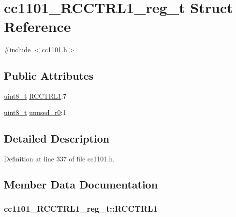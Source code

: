 \hypertarget{structcc1101___r_c_c_t_r_l1__reg__t}{}\section{cc1101\+\_\+\+R\+C\+C\+T\+R\+L1\+\_\+reg\+\_\+t Struct Reference}
\label{structcc1101___r_c_c_t_r_l1__reg__t}


{\ttfamily \#include $<$cc1101.\+h$>$}

\subsection*{Public Attributes}
\begin{DoxyCompactItemize}
\item 
\hyperlink{_p_e___types_8h_aba7bc1797add20fe3efdf37ced1182c5}{uint8\+\_\+t} \hyperlink{structcc1101___r_c_c_t_r_l1__reg__t_a20e9cb8583d5dd8eb3c6ba81bf985db9}{R\+C\+C\+T\+R\+L1}\+:7
\item 
\hyperlink{_p_e___types_8h_aba7bc1797add20fe3efdf37ced1182c5}{uint8\+\_\+t} \hyperlink{structcc1101___r_c_c_t_r_l1__reg__t_a4af45b13f39313a252b4fdfe3fd77864}{unused\+\_\+r0}\+:1
\end{DoxyCompactItemize}


\subsection{Detailed Description}


Definition at line 337 of file cc1101.\+h.



\subsection{Member Data Documentation}
\subsubsection[{\texorpdfstring{R\+C\+C\+T\+R\+L1}{RCCTRL1}}]{ cc1101\+\_\+\+R\+C\+C\+T\+R\+L1\+\_\+reg\+\_\+t\+::\+R\+C\+C\+T\+R\+L1}\hypertarget{structcc1101___r_c_c_t_r_l1__reg__t_a20e9cb8583d5dd8eb3c6ba81bf985db9}{}\label{structcc1101___r_c_c_t_r_l1__reg__t_a20e9cb8583d5dd8eb3c6ba81bf985db9}


